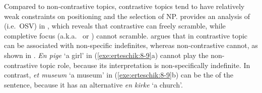 



Compared to non-contrastive topics, contrastive topics tend to have
relatively weak constraints on positioning and the selection of
NP. \citet{choi:99} provides an analysis of 
(i.e.\ OSV) in , which reveals that contrastive  can
freely scramble, while completive focus (a.k.a.\ 
or ) cannot scramble. \citet{erteschik:07} argues that
in  contrastive topic can be associated with non-specific
indefinites, whereas non-contrastive  cannot, as shown in
. \textit{En pige} `a girl' in
(\ref{exe:erteschik:8-9}a) cannot play the non-contrastive topic role,
because its interpretation is non-specifically indefinite. In
contrast, \textit{et museum} `a museum' in (\ref{exe:erteschik:8-9}b)
can be the  of the sentence, because it has an alternative
\textit{en kirke} `a church'.





